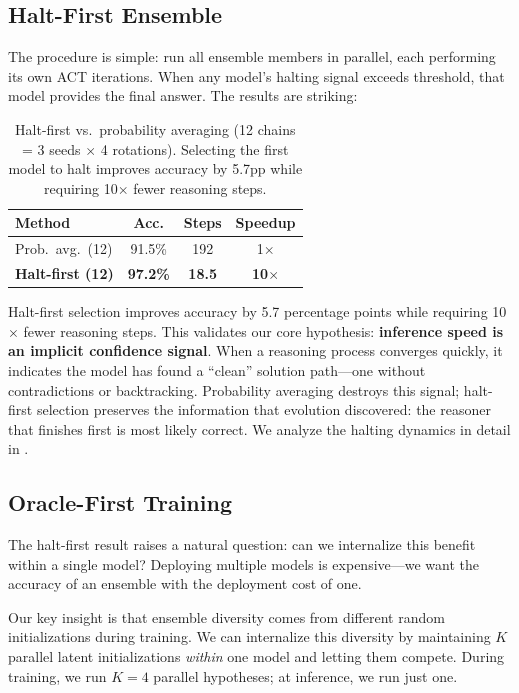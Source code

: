 \subsection{Halt-First Ensemble}

The procedure is simple: run all ensemble members in parallel, each performing
its own ACT iterations. When any model's halting signal exceeds threshold, that
model provides the final answer. The results are striking:
%
\begin{table}[h]
\centering
\begin{tabular}{@{}lccc@{}}
\toprule
Method & Acc. & Steps & Speedup \\
\midrule
Prob.\ avg.\ (12) & 91.5\% & 192 & 1$\times$ \\  %
\textbf{Halt-first (12)} & \textbf{97.2\%} & \textbf{18.5} & \textbf{10$\times$} \\  %
\bottomrule
\end{tabular}
\caption{Halt-first vs.\ probability averaging (12 chains = 3 seeds $\times$
4 rotations). Selecting the first model to halt improves accuracy by 5.7pp
while requiring 10$\times$ fewer reasoning steps.}
\label{tab:halt-first}
\end{table}
%
Halt-first selection improves accuracy by 5.7 percentage points while requiring
10$\times$ fewer reasoning steps. This validates our core hypothesis:
\textbf{inference speed is an implicit confidence signal}. When a reasoning
process converges quickly, it indicates the model has found a ``clean''
solution path---one without contradictions or backtracking. Probability
averaging destroys this signal; halt-first selection preserves the information
that evolution discovered: the reasoner that finishes first is most likely
correct. We analyze the halting dynamics in detail in .

\subsection{Oracle-First Training}

The halt-first result raises a natural question: can we internalize this
benefit within a single model? Deploying multiple models is expensive---we want
the accuracy of an ensemble with the deployment cost of one.

Our key insight is that ensemble diversity comes from different random
initializations during training. We can internalize this diversity by
maintaining $K$ parallel latent initializations \emph{within} one model and
letting them compete. During training, we run $K{=}4$ parallel hypotheses; at
inference, we run just one.

